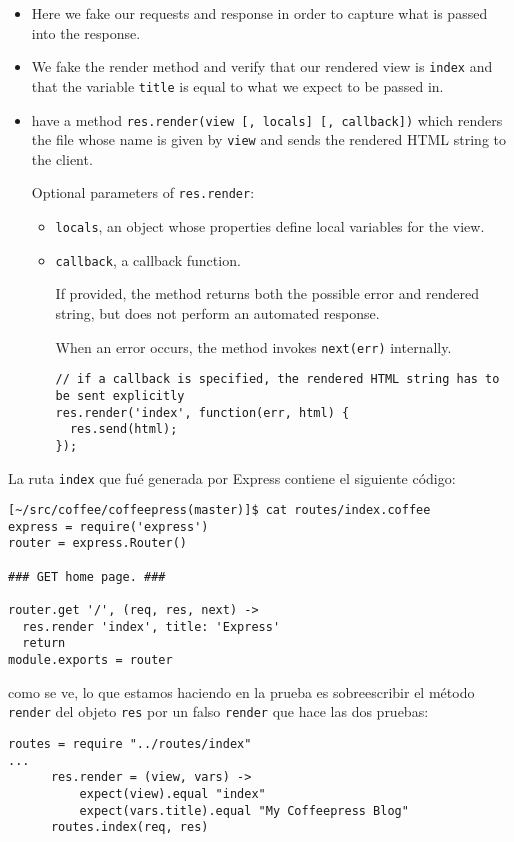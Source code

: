 \begin{itemize}
\item
Here we fake our requests and response in order to capture what is
passed into the response. 
\item
We fake the render method and verify that our
rendered view is \verb|index| and that the variable \verb|title| 
is equal to what we expect to be passed in. 
\item
{}
have a method \verb|res.render(view [, locals] [, callback])|
which renders the file whose name is given by \verb|view| and sends the rendered HTML string to the client. 

Optional parameters of \verb|res.render|:
  \begin{itemize}

  \item \verb|locals|, an object whose properties define local variables for the view.
  \item \verb|callback|, a callback function. 

  If provided, the method returns both the possible error and rendered string, but does not perform an automated response. 

  When an error occurs, the method invokes \verb|next(err)| 
  internally.
\begin{verbatim}
// if a callback is specified, the rendered HTML string has to be sent explicitly
res.render('index', function(err, html) {
  res.send(html);
});
\end{verbatim}
  \end{itemize}
\end{itemize}
La ruta \verb|index| que fué generada por Express contiene el siguiente código:
\begin{verbatim}
[~/src/coffee/coffeepress(master)]$ cat routes/index.coffee 
express = require('express')
router = express.Router()

### GET home page. ###

router.get '/', (req, res, next) ->
  res.render 'index', title: 'Express'
  return
module.exports = router
\end{verbatim}
como se ve, lo que estamos haciendo en la prueba es sobreescribir el método \verb|render| 
del objeto \verb|res| por 
un falso \verb|render| que hace las dos pruebas:
\begin{verbatim}
routes = require "../routes/index"
...
      res.render = (view, vars) ->
          expect(view).equal "index"
          expect(vars.title).equal "My Coffeepress Blog"
      routes.index(req, res)
\end{verbatim}

